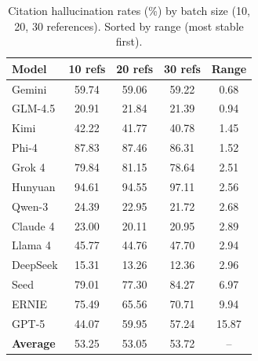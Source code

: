 \begin{table}[t]
  \centering
  \begin{threeparttable}
    \caption{Citation hallucination rates (\%) by batch size (10, 20, 30 references). Sorted by range (most stable first).}
    \label{tab:batch_size}
    \small
{}
\begin{tabular}{lcccc}
\toprule
\textbf{Model} & \cellcolor{red!12}\textbf{10 refs} & \cellcolor{red!12}\textbf{20 refs} & \cellcolor{red!12}\textbf{30 refs} & \cellcolor{red!12}\textbf{Range} \\
\midrule
Gemini & \cellcolor{red!24}59.74 & \cellcolor{red!24}59.06 & \cellcolor{red!24}59.22 & \cellcolor{red!8}0.68 \\
GLM-4.5 & \cellcolor{red!12}20.91 & \cellcolor{red!12}21.84 & \cellcolor{red!12}21.39 & \cellcolor{red!8}0.94 \\
Kimi & \cellcolor{red!20}42.22 & \cellcolor{red!20}41.77 & \cellcolor{red!20}40.78 & \cellcolor{red!10}1.45 \\
Phi-4 & \cellcolor{red!34}87.83 & \cellcolor{red!34}87.46 & \cellcolor{red!34}86.31 & \cellcolor{red!12}1.52 \\
Grok 4 & \cellcolor{red!30}79.84 & \cellcolor{red!30}81.15 & \cellcolor{red!30}78.64 & \cellcolor{red!14}2.51 \\
Hunyuan & \cellcolor{red!34}94.61 & \cellcolor{red!34}94.55 & \cellcolor{red!34}97.11 & \cellcolor{red!14}2.56 \\
Qwen-3 & \cellcolor{red!14}24.39 & \cellcolor{red!14}22.95 & \cellcolor{red!14}21.72 & \cellcolor{red!14}2.68 \\
Claude 4 & \cellcolor{red!14}23.00 & \cellcolor{red!14}20.11 & \cellcolor{red!14}20.95 & \cellcolor{red!14}2.89 \\
Llama 4 & \cellcolor{red!20}45.77 & \cellcolor{red!20}44.76 & \cellcolor{red!20}47.70 & \cellcolor{red!14}2.94 \\
DeepSeek & \cellcolor{red!10}15.31 & \cellcolor{red!10}13.26 & \cellcolor{red!10}12.36 & \cellcolor{red!14}2.96 \\
Seed & \cellcolor{red!30}79.01 & \cellcolor{red!30}77.30 & \cellcolor{red!30}84.27 & \cellcolor{red!18}6.97 \\
ERNIE & \cellcolor{red!30}75.49 & \cellcolor{red!26}65.56 & \cellcolor{red!28}70.71 & \cellcolor{red!18}9.94 \\
GPT-5 & \cellcolor{red!20}44.07 & \cellcolor{red!26}59.95 & \cellcolor{red!26}57.24 & \cellcolor{red!20}15.87 \\
\midrule
\textbf{Average} & \cellcolor{red!20}53.25 & \cellcolor{red!20}53.05 & \cellcolor{red!20}53.72 & \cellcolor{red!12}-- \\
\bottomrule
\end{tabular}
  \end{threeparttable}
\end{table}

